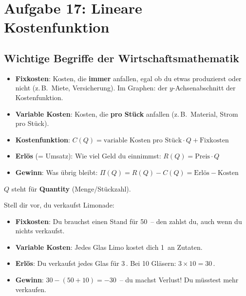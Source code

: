 \documentclass[12pt,a4paper]{article}
\begin{document}
\newpage

\section{Aufgabe 17: Lineare Kostenfunktion}

\subsection{Wichtige Begriffe der Wirtschaftsmathematik}

\begin{merkbox}[title={Grundbegriffe}]
\begin{itemize}
  \item \textbf{Fixkosten}: Kosten, die \textbf{immer} anfallen, egal ob du etwas produzierst oder nicht (z.\,B.\ Miete, Versicherung). Im Graphen: der $y$-Achsenabschnitt der Kostenfunktion.
  \item \textbf{Variable Kosten}: Kosten, die \textbf{pro St\"uck} anfallen (z.\,B.\ Material, Strom pro St\"uck).
  \item \textbf{Kostenfunktion}: $C(Q) = \text{variable Kosten pro St\"uck} \cdot Q + \text{Fixkosten}$
  \item \textbf{Erl\"os} (= Umsatz): Wie viel Geld du einnimmst: $R(Q) = \text{Preis} \cdot Q$
  \item \textbf{Gewinn}: Was \"ubrig bleibt: $\Pi(Q) = R(Q) - C(Q) = \text{Erl\"os} - \text{Kosten}$
\end{itemize}
$Q$ steht f\"ur \textbf{Quantity} (Menge/St\"uckzahl).
\end{merkbox}

\begin{analogie}
Stell dir vor, du verkaufst Limonade:
\begin{itemize}
  \item \textbf{Fixkosten}: Du brauchst einen Stand f\"ur 50\,\texteuro{} -- den zahlst du, auch wenn du nichts verkaufst.
  \item \textbf{Variable Kosten}: Jedes Glas Limo kostet dich 1\,\texteuro{} an Zutaten.
  \item \textbf{Erl\"os}: Du verkaufst jedes Glas f\"ur 3\,\texteuro{}. Bei 10 Gl\"asern: $3 \times 10 = 30$\,\texteuro{}.
  \item \textbf{Gewinn}: $30 - (50 + 10) = -30$\,\texteuro{} -- du machst Verlust! Du m\"usstest mehr verkaufen.
\end{itemize}
\end{analogie}
\end{document}
